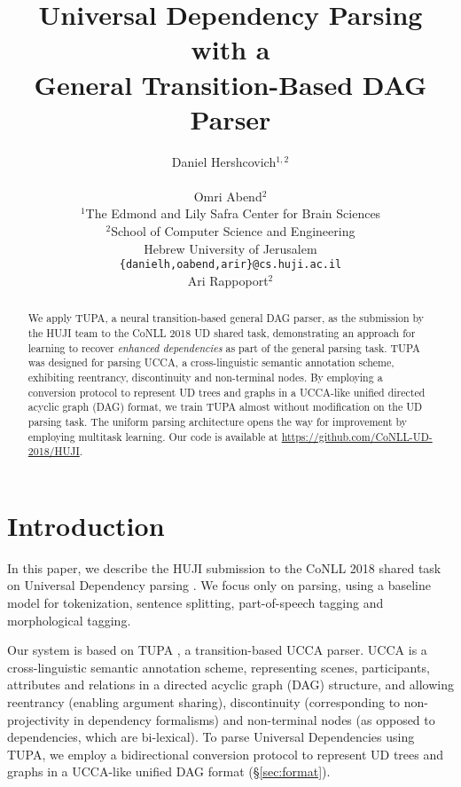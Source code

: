 \documentclass[11pt,a4paper]{article}
\title{Universal Dependency Parsing with a \\ General Transition-Based DAG Parser}
\author{Daniel Hershcovich$^{1,2}$ \\
  \\\And
  Omri Abend$^2$ \\
  $^1$The Edmond and Lily Safra Center for Brain Sciences \\
  $^2$School of Computer Science and Engineering \\
  Hebrew University of Jerusalem \\
  \texttt{\{danielh,oabend,arir\}@cs.huji.ac.il}
  \\\And
  Ari Rappoport$^2$
}
\date{}
\begin{document}
\maketitle
\begin{abstract}
  We apply TUPA, a neural transition-based general DAG parser,
  as the submission by the HUJI team to the CoNLL 2018 UD shared task,
  demonstrating an approach for learning to recover \textit{enhanced dependencies}
  as part of the general parsing task.
  TUPA was designed for parsing UCCA, a cross-linguistic
  semantic annotation scheme, exhibiting
  reentrancy, discontinuity and non-terminal nodes.
  By employing a conversion protocol to represent
  UD trees and graphs in a UCCA-like unified directed acyclic graph (DAG) format,
  we train TUPA almost without modification on the UD parsing task.
  The uniform parsing architecture opens the way for improvement by employing
  multitask learning.
  Our code is available at \url{https://github.com/CoNLL-UD-2018/HUJI}.
\end{abstract}

\section{Introduction}\label{sec:introduction}

In this paper, we describe the HUJI submission to the CoNLL 2018 shared task
on Universal Dependency parsing \cite{udst:overview2018}.
We focus only on parsing, using a baseline model \cite[UDPipe 1.2;][]{udpipe,udpipe:2017}
for tokenization, sentence splitting, part-of-speech tagging and morphological tagging.

Our system is based on TUPA \cite[see \S\ref{sec:model}]{hershcovich2017a,hershcovich2018multitask},
a transition-based UCCA parser.
UCCA \cite[Universal Conceptual Cognitive Annotation;][]{abend2013universal} is a
cross-linguistic semantic annotation scheme, representing scenes, participants,
attributes and relations in a directed acyclic graph (DAG) structure,
and allowing reentrancy (enabling argument sharing),
discontinuity (corresponding to non-projectivity in dependency formalisms)
and non-terminal nodes (as opposed to dependencies, which are bi-lexical).
To parse Universal Dependencies \cite{nivre2016universal}
using TUPA, we employ a bidirectional conversion protocol to represent
UD trees and graphs in a UCCA-like unified DAG format (\S\ref{sec:format}).
\end{document}
